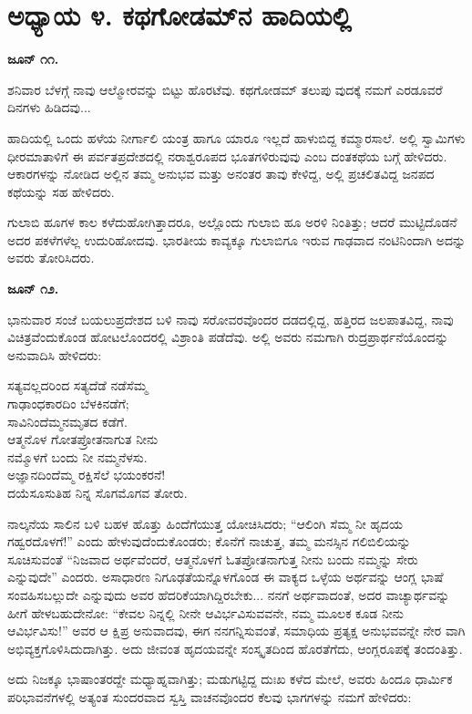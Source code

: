 
\chapter{ಅಧ್ಯಾಯ ೪. ಕಥಗೋಡಮ್​ನ ಹಾದಿಯಲ್ಲಿ}

\textbf{ಜೂನ್ ೧೧.}

ಶನಿವಾರ ಬೆಳಗ್ಗೆ ನಾವು ಆಲ್ಮೋರವನ್ನು ಬಿಟ್ಟು ಹೊರಟೆವು. ಕಥಗೋಡಮ್​ ತಲುಪು ವುದಕ್ಕೆ ನಮಗೆ ಎರಡೂವರೆ ದಿನಗಳು ಹಿಡಿದವು...

ಹಾದಿಯಲ್ಲಿ ಒಂದು ಹಳೆಯ ನೀರ್ಗಾಲಿ ಯಂತ್ರ ಹಾಗೂ ಯಾರೂ ಇಲ್ಲದೆ ಹಾಳುಬಿದ್ದ ಕಮ್ಮಾರಸಾಲೆ. ಅಲ್ಲಿ ಸ್ವಾಮಿಗಳು ಧೀರಮಾತಾಳಿಗೆ ಈ ಪರ್ವತಪ್ರದೇಶದಲ್ಲಿ ನರಾಶ್ವರೂಪದ ಭೂತಗಳಿರುವುವು ಎಂಬ ದಂತಕಥೆಯ ಬಗ್ಗೆ ಹೇಳಿದರು. ಆಕಾರಗಳನ್ನು ನೋಡಿದ ಅಲ್ಲಿನ ತಮ್ಮ ಅನುಭವ ಮತ್ತು ಅನಂತರ ತಾವು ಕೇಳಿದ್ದ, ಅಲ್ಲಿ ಪ್ರಚಲಿತವಿದ್ದ ಜನಪದ ಕಥೆಯನ್ನು ಸಹ ಹೇಳಿದರು.

ಗುಲಾಬಿ ಹೂಗಳ ಕಾಲ ಕಳೆದುಹೋಗಿತ್ತಾದರೂ, ಅಲ್ಲೊಂದು ಗುಲಾಬಿ ಹೂ ಅರಳಿ ನಿಂತಿತ್ತು; ಆದರೆ ಮುಟ್ಟಿದೊಡನೆ ಅದರ ಪಕಳೆಗಳೆಲ್ಲ ಉದುರಿಹೋದವು. ಭಾರತೀಯ ಕಾವ್ಯಕ್ಕೂ ಗುಲಾಬಿಗೂ ಇರುವ ಗಾಢವಾದ ನಂಟಿನಿಂದಾಗಿ ಅದನ್ನು ಅವರು ತೋರಿಸಿದರು.

\textbf{ಜೂನ್ ೧೨.}

ಭಾನುವಾರ ಸಂಜೆ ಬಯಲುಪ್ರದೇಶದ ಬಳಿ ನಾವು ಸರೋವರವೊಂದರ ದಡದಲ್ಲಿದ್ದ, ಹತ್ತಿರದ ಜಲಪಾತವಿದ್ದ, ನಾವು ವಿಚಿತ್ರವೆಂದುಕೊಂಡ ಹೋಟಲೊಂದರಲ್ಲಿ ವಿಶ್ರಾಂತಿ ಪಡೆದೆವು. ಅಲ್ಲಿ ಅವರು ನಮಗಾಗಿ ರುದ್ರಪ್ರಾರ್ಥನೆಯೊಂದನ್ನು ಅನುವಾದಿಸಿ ಹೇಳಿದರು:

\begin{myquote}
ಸತ್ಯವಲ್ಲದರಿಂದ ಸತ್ಯದೆಡೆ ನಡೆಸೆಮ್ಮ\\ಗಾಢಾಂಧಕಾರದಿಂ ಬೆಳಕಿನಡೆಗೆ;\\ಸಾವಿನಿಂದೆಮ್ಮನಮೃತದ ಕಡೆಗೆ.\\ಆತ್ಮನೊಳ ಗೋತಪ್ರೋತನಾಗುತ ನೀನು\\ನಮ್ಮೊಳಗೆ ಬಂದು ನೀ ನಮ್ಮನೆಳಸು.\\ಅಜ್ಞಾನದಿಂದೆಮ್ಮ ರಕ್ಷಿಸೆಲೆ ಭಯಂಕರನೆ!\\ದಯೆಸೂಸುತಿಹ ನಿನ್ನ ಸೊಗಮೊಗವ ತೋರು.
\end{myquote}

ನಾಲ್ಕನೆಯ ಸಾಲಿನ ಬಳಿ ಬಹಳ ಹೊತ್ತು ಹಿಂದೆಗೆಯುತ್ತ ಯೋಚಿಸಿದರು; “ಆಲಿಂಗಿ ಸೆಮ್ಮ ನೀ ಹೃದಯ ಗಹ್ವರದೊಳಗೆ!” ಎಂದು ಹೇಳುವುದೆಂದುಕೊಂಡರು; ಕೊನೆಗೆ ನಾಚುತ್ತ, ತಮ್ಮ ಮನಸ್ಸಿನ ಗಲಿಬಿಲಿಯನ್ನು ಸೂಚಿಸುವಂತೆ “ನಿಜವಾದ ಅರ್ಥವೆಂದರೆ, ಆತ್ಮನೊಳಗೆ ಓತಪ್ರೋತನಾಗುತ್ತ ನೀನು ಬಂದು ನಮ್ಮನ್ನು ಸೇರು ಎನ್ನುವುದೇ” ಎಂದರು. ಅಸಾಧಾರಣ ನಿಗೂಢತೆಯನ್ನೊಳಗೊಂಡ ಈ ವಾಕ್ಯದ ಒಳ್ಳೆಯ ಅರ್ಥವನ್ನು ಆಂಗ್ಲ ಭಾಷೆ ಸಂವಹಿಸಬಲ್ಲುದೇ ಎನ್ನುವುದು ಅವರ ಹೆದರಿಕೆಯಾಗಿದ್ದಿರಬೇಕು... ನನಗೆ ಅರ್ಥವಾದಂತೆ, ಅದರ ವಾಚ್ಯಾರ್ಥವನ್ನು ಹೀಗೆ ಹೇಳಬಹುದೇನೋ: “ಕೇವಲ ನಿನ್ನಲ್ಲಿ ನೀನೇ ಆವಿರ್ಭವಿಸುವವನೇ, ನಮ್ಮ ಮೂಲಕ ಕೂಡ ನೀನು ಆವಿರ್ಭವಿಸು!” ಅವರ ಆ ಕ್ಷಿಪ್ರ ಅನುವಾದವು, ಈಗ ನನಗನ್ನಿಸುವಂತೆ, ಸಮಾಧಿಯ ಪ್ರತ್ಯಕ್ಷ ಅನುಭವವನ್ನೇ ನೇರ ವಾಗಿ ಅಭಿವ್ಯಕ್ತಗೊಳಿಸಿದುದಾಗಿತ್ತು. ಅದು ಜೀವಂತ ಹೃದಯವನ್ನೇ ಸಂಸ್ಕೃತದಿಂದ ಹೊರತೆಗೆದು, ಆಂಗ್ಲರೂಪಕ್ಕೆ ತಂದಂತಿತ್ತು.

ಅದು ನಿಜಕ್ಕೂ ಭಾಷಾಂತರದ್ದೇ ಮಧ್ಯಾಹ್ನವಾಗಿತ್ತು; ಮಡುಗಟ್ಟಿದ್ದ ದುಃಖ ಕಳೆದ ಮೇಲೆ, ಅವರು ಹಿಂದೂ ಧಾರ್ಮಿಕ ಪರಿಭಾವನೆಗಳಲ್ಲಿ ಅತ್ಯಂತ ಸುಂದರವಾದ ಸ್ವಸ್ತಿ ವಾಚನವೊಂದರ ಕೆಲವು ಭಾಗಗಳನ್ನು ನಮಗೆ ಹೇಳಿದರು:

